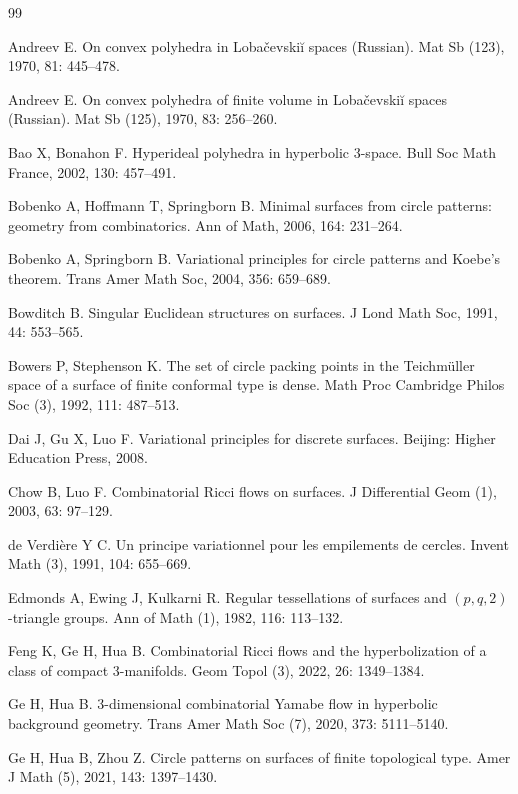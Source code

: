 \documentclass[12pt]{amsart}
\numberwithin{equation}{section}
\begin{document}
\begin{thebibliography}{99}

 Andreev E. On convex polyhedra in Loba\v{c}evski\u{i} spaces (Russian). Mat Sb (123), 1970, 81: 445--478.

 Andreev E. On convex polyhedra of finite volume in Loba\v{c}evski\u{i} spaces (Russian). Mat Sb (125), 1970, 83: 256--260.

 Bao X, Bonahon F. Hyperideal polyhedra in hyperbolic 3-space. Bull Soc Math France, 2002, 130: 457--491.

 Bobenko A, Hoffmann T, Springborn B. Minimal surfaces from circle patterns: geometry from combinatorics. Ann of Math, 2006, 164: 231--264.

 Bobenko A, Springborn B. Variational principles for circle patterns and Koebe's theorem. Trans Amer Math Soc, 2004, 356: 659--689.

 Bowditch B. Singular Euclidean structures on surfaces. J Lond Math Soc, 1991, 44: 553--565.

 Bowers P, Stephenson K. The set of circle packing points in the Teichm\"uller space of a surface of finite conformal type is dense. Math Proc Cambridge Philos Soc (3), 1992, 111: 487--513.

 Dai J, Gu X, Luo F. Variational principles for discrete surfaces. Beijing: Higher Education Press, 2008.

 Chow B, Luo F. Combinatorial Ricci flows on surfaces. J Differential Geom (1), 2003, 63: 97--129.

 de Verdi\`ere Y C. Un principe variationnel pour les empilements de cercles. Invent Math (3), 1991, 104: 655--669.

 Edmonds A, Ewing J, Kulkarni R. Regular tessellations of surfaces and $(p,q,2)$-triangle groups. Ann of Math (1), 1982, 116: 113--132.

 Feng K, Ge H, Hua B. Combinatorial Ricci flows and the hyperbolization of a class of compact 3-manifolds. Geom Topol (3), 2022, 26: 1349--1384.

 Ge H, Hua B. 3-dimensional combinatorial Yamabe flow in hyperbolic background geometry. Trans Amer Math Soc (7), 2020, 373: 5111--5140.

 Ge H, Hua B, Zhou Z. Circle patterns on surfaces of finite topological type. Amer J Math (5), 2021, 143: 1397--1430.


\end{thebibliography}
\end{document}
